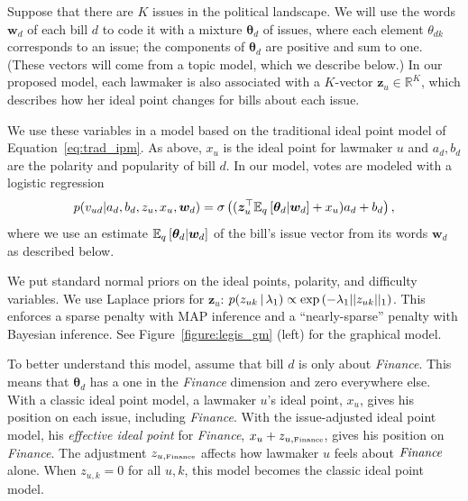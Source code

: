 Suppose that there are $K$ issues in the political landscape.  We will
use the words $\bm w_d$ of each bill $d$ to code it with a mixture
$\bm \theta_d$ of issues, where each element $\theta_{dk}$
corresponds to an issue; the components of $\bm \theta_d$ are positive
and sum to one. (These vectors will come from a topic model, which we
describe below.)  In our proposed model, each lawmaker is also
associated with a $K$-vector $\bm z_u \in \mathbb{R}^K$, which
describes how her ideal point changes for bills about each issue.


We use these variables in a model based on the traditional ideal point
model of Equation~\ref{eq:trad_ipm}. As above, $x_u$ is the ideal
point for lawmaker $u$ and $a_d, b_d$ are the polarity and popularity
of bill $d$. In our model, votes are modeled with a logistic
regression
\begin{equation}
  \label{equation:exploratory_ipm_old}
  p(v_{ud} | a_d, b_d, z_u, x_u, \bm w_d) =
  \sigma \left( ( \bm z_u^\top \mathbb{E}_q\left[\bm \theta_d | \bm w_d\right] + x_u ) a_d + b_d \right),
\end{equation}
where we use an estimate $\mathbb{E}_q\left[\bm \theta_d | \bm w_d\right]$ of the
bill's issue vector from its words $\bm w_d$ as described below.

We put standard normal priors on the ideal points, polarity, and
difficulty variables.  We use Laplace priors for $\bm z_{u}$:
$p(z_{uk} \, | \, \lambda_1) \propto \exp\left( - \lambda_1 || z_{uk} ||_1
\right)$.  This enforces a sparse penalty with MAP inference and a
``nearly-sparse'' penalty with Bayesian inference. See
Figure~\ref{figure:legis_gm} (left) for the graphical model.

To better understand this model, assume that bill $d$ is only about
\emph{Finance}.  This means that $\bm \theta_d$ has a one in the
\emph{Finance} dimension and zero everywhere else.  With a classic
ideal point model, a lawmaker $u$'s ideal point, $x_u$, gives his
position on each issue, including \emph{Finance}.  With the
issue-adjusted ideal point model, his \emph{effective ideal point} for
\emph{ Finance}, $x_u + z_{u,\mbox{\tiny Finance}}$, gives his
position on \emph{Finance}.  The adjustment $z_{u, \mbox{\tiny
    Finance}}$ affects how lawmaker $u$ feels about $\emph{Finance}$
alone. When $z_{u,k}=0$ for all $u,k$, this model becomes the classic
ideal point model.

